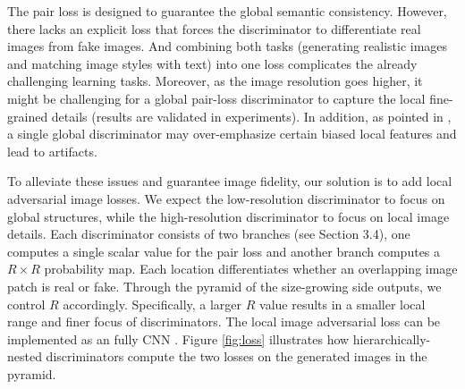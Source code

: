 \documentclass[10pt,twocolumn,letterpaper]{article}
\begin{document}
The pair loss is designed to guarantee the global semantic consistency. However, there lacks an explicit loss that forces the discriminator to differentiate real images from fake images. And combining both tasks (generating realistic images and matching image styles with text) into one loss complicates the already challenging learning tasks. Moreover, as the image resolution goes higher, it might be challenging for a global pair-loss discriminator to capture the local fine-grained details (results are validated in experiments).
In addition, as pointed in \cite{shrivastava2016learning}, a single global discriminator may over-emphasize certain biased local features and lead to artifacts. 

To alleviate these issues and guarantee image fidelity, our solution is to add local adversarial image losses.
%
We expect the low-resolution discriminator to focus on global structures, while the high-resolution discriminator to focus  on local image details.
Each discriminator consists of two branches (see Section 3.4), one computes a single scalar value for the pair loss and another branch computes a $R{\times}R$ probability map. 
Each location differentiates whether an overlapping image patch is real or fake.
Through the pyramid of the size-growing side outputs, we control $R$ accordingly. Specifically, a larger $R$ value results in a smaller local range and finer focus of discriminators.
The local image adversarial loss can be implemented as an fully CNN \cite{shrivastava2016learning,zhu2017unpaired,isola2016image}.
Figure \ref{fig:loss} illustrates how hierarchically-nested discriminators compute the two losses on the generated images in the pyramid. 
\end{document}

